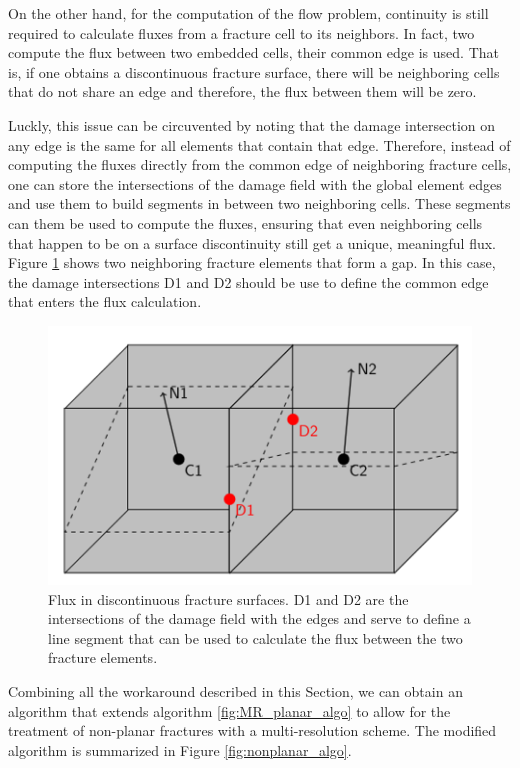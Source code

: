 On the other hand, for the computation of the flow problem, continuity is still required to calculate fluxes from a fracture cell to its neighbors. In fact, two compute the flux between two embedded cells, their common edge is used. That is, if one obtains a discontinuous fracture surface, there will be neighboring cells that do not share an edge and therefore, the flux between them will be zero.

Luckly, this issue can be circuvented by noting that the damage intersection on any edge is the same for all elements that contain that edge. Therefore, instead of computing the fluxes directly from the common edge of neighboring fracture cells, one can store the intersections of the damage field with the global element edges and use them to build segments in between two neighboring cells. These segments can them be used to compute the fluxes, ensuring that even neighboring cells that happen to be on a surface discontinuity still get a unique, meaningful flux. Figure \ref{fig:flux_calculations} shows two neighboring fracture elements that form a gap. In this case, the damage intersections D1 and D2 should be use to define the common edge that enters the flux calculation.

\begin{figure}[h]
    \centering
    \includegraphics[width=0.6\linewidth]{Chapter4/figures/nonplanar/nonplanar_flux.png}
    \caption{Flux in discontinuous fracture surfaces. D1 and D2 are the intersections of the damage field with the edges and serve to define a line segment that can be used to calculate the flux between the two fracture elements.}
    \label{fig:flux_calculations}
\end{figure}

Combining all the workaround described in this Section, we can obtain an algorithm that extends algorithm \ref{fig:MR_planar_algo} to allow for the treatment of non-planar fractures with a multi-resolution scheme. The modified algorithm is summarized in Figure \ref{fig:nonplanar_algo}.

